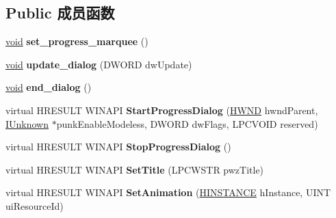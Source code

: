 \subsection*{Public 成员函数}
\begin{DoxyCompactItemize}
\item 
\mbox{\label{class_c_progress_dialog_a7274cc256cd014600e9c0294c89aab86}} 
\hyperlink{interfacevoid}{void} {\bfseries set\+\_\+progress\+\_\+marquee} ()
\item 
\mbox{\label{class_c_progress_dialog_a40f75024b24a869e96bab86833c9f6c5}} 
\hyperlink{interfacevoid}{void} {\bfseries update\+\_\+dialog} (D\+W\+O\+RD dw\+Update)
\item 
\mbox{\label{class_c_progress_dialog_a7b9fcaef96819126960cf228896e1885}} 
\hyperlink{interfacevoid}{void} {\bfseries end\+\_\+dialog} ()
\item 
\mbox{\label{class_c_progress_dialog_a94cd9816e3d55649f4bdc8170705eb0e}} 
virtual H\+R\+E\+S\+U\+LT W\+I\+N\+A\+PI {\bfseries Start\+Progress\+Dialog} (\hyperlink{interfacevoid}{H\+W\+ND} hwnd\+Parent, \hyperlink{interface_i_unknown}{I\+Unknown} $\ast$punk\+Enable\+Modeless, D\+W\+O\+RD dw\+Flags, L\+P\+C\+V\+O\+ID reserved)
\item 
\mbox{\label{class_c_progress_dialog_abf157ae701040215a61a847a5217837a}} 
virtual H\+R\+E\+S\+U\+LT W\+I\+N\+A\+PI {\bfseries Stop\+Progress\+Dialog} ()
\item 
\mbox{\label{class_c_progress_dialog_a321731e142a6de61084aab19a7fc32f1}} 
virtual H\+R\+E\+S\+U\+LT W\+I\+N\+A\+PI {\bfseries Set\+Title} (L\+P\+C\+W\+S\+TR pwz\+Title)
\item 
\mbox{\label{class_c_progress_dialog_a7a75b2b2dc730d7af72a9652f865a69b}} 
virtual H\+R\+E\+S\+U\+LT W\+I\+N\+A\+PI {\bfseries Set\+Animation} (\hyperlink{interfacevoid}{H\+I\+N\+S\+T\+A\+N\+CE} h\+Instance, U\+I\+NT ui\+Resource\+Id)
\item 
\mbox{\label{class_c_progress_dialog_a17ba14b51ee2df4c07215b5bfebfbccf}} 

\end{DoxyCompactItemize}
